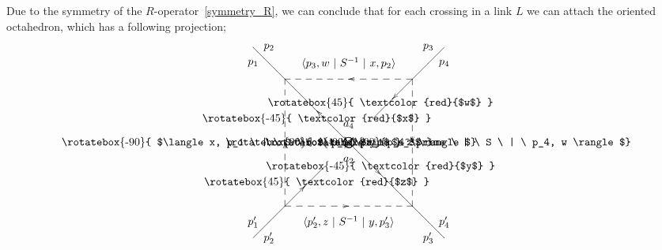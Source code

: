 \documentclass[12pt]{article}
\numberwithin{equation}{section}
\begin{document}
Due to the symmetry of the $R$-operator~\eqref{symmetry_R},
we can conclude that
for each crossing in a link  $L$
we can attach the oriented
octahedron, which has a following projection;
\begin{equation}
  \label{attach_octa}
  \xy/r1.2pc/:.
  {
    { (0,0)*+{\text{\LARGE$\bigotimes$}} },
    { (0,0) \ar@{-}|@{>} (4,-4)},
    { (0,0) \ar@{-}|@{>} (-4,4)},
    { (1.5,1.5) \ar@{-}|@{<} (4,4)},
    { (-1.5,-1.5) \ar@{-}|@{<} (-4,-4)},
    { (4,4) \ar@{--}|@{>} (4,-4)},
    { (4,4) \ar@{--}|@{>} (-4,4)},
    { (-4,-4) \ar@{--}|@{>} (4,-4)},
    { (-4,-4) \ar@{--}|@{>} (-4,4)},
    { (4,4) \ar@{-}|@{} (6,6)},
    { (4,-4) \ar@{-}|@{} (6,-6)},
    { (-4,4) \ar@{-}|@{} (-6,6)},
    { (-4,-4) \ar@{-}|@{} (-6,-6)},
%
    { (-6,5)*+{p_1} },
    { (-5,6)*+{p_2} },
    { (5,6)*+{p_3} },
    { (6,5)*+{p_4} },
    { (-6,-5)*+{p_1^\prime} },
    { (-5,-6)*+{p_2^\prime} },
    { (5,-6)*+{p_3^\prime} },
    { (6,-5)*+{p_4^\prime} },
    { (0,5)*+{\langle p_3, w \ | \  S^{-1}  \ | \  x, p_2 \rangle} },
    { (0,-5)*+{\langle p_2^\prime, z \ | \  S^{-1} \  | \  y, p_3^\prime \rangle} },
    { (-5,0)*+{
        \text{
          \rotatebox{-90}{
            $\langle x, p_1 \ | \  S  \ | \  p_1^\prime, z \rangle$}
        }}
      },
    { (5,0)*+{
        \text{
          \rotatebox{90}{
            $\langle y, p_4^\prime \ | \  S \  | \  p_4, w \rangle$}
        }}
      },
%
    { (2,2.5)*+{
        \text{
          \rotatebox{45}{
            \textcolor{red}{$w$}
            } }} },
    { (-2,-2.5)*+{
        \text{
          \rotatebox{45}{
            \textcolor{red}{$z$}
            } }} },
    { (-2,1.5)*+{
        \text{
          \rotatebox{-45}{
            \textcolor{red}{$x$}
            } }} },
    { (2,-1.5)*+{
        \text{
          \rotatebox{-45}{
            \textcolor{red}{$y$}
            } }} },
        { (0,1.1)*+{
        \text{
          $a_4$
              } }},
        { (1.1,0)*+{
        \text{
          \rotatebox{90}{
            $a_3$
            } }} },
    { (-1.1,0)*+{
        \text{
          \rotatebox{-90}{
            $a_1$
          }} }},
    { (0,-1.1)*+{
        \text{
          $a_2$
          }} },
    }
  \endxy
\end{equation}
\end{document}
